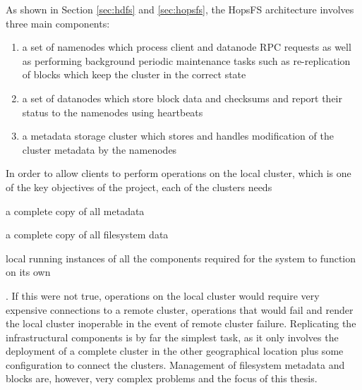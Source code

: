 As shown in Section \ref{sec:hdfs} and \ref{sec:hopsfs}, the HopsFS architecture involves three main components:
\begin{enumerate}
    \item a set of namenodes which process client and datanode RPC requests as well as performing background periodic maintenance tasks such as re-replication of blocks which keep the cluster  in the correct state
    \item a set of datanodes which store block data and checksums and report their status to the namenodes using heartbeats
    \item a metadata storage cluster which stores and handles modification of the cluster metadata by the namenodes
\end{enumerate}
In order to allow clients to perform operations on the local cluster, which is one of the key objectives of the project, each of the clusters needs
\begin{inparaenum}
    \item a complete copy of all metadata
    \item a complete copy of all filesystem data
    \item local running instances of all the components required for the system to function on its own
\end{inparaenum}.
If this were not true, operations on the local cluster would require very expensive connections to a remote cluster, operations that would fail and render the local cluster inoperable in the event of remote cluster failure.
Replicating the infrastructural components is by far the simplest task, as it only involves the deployment of a complete cluster in the other geographical location plus some configuration to connect the clusters.
Management of filesystem metadata and blocks are, however, very complex problems and the focus of this thesis.